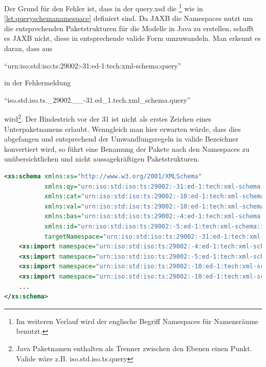Der Grund für den Fehler ist, dass in der query.xsd die \footnote{Im weiteren Verlauf wird der englische Begriff Namespaces für Namensräume benutzt.} wie in  \autoref{lst:queryschemanamespace} definiert sind. Da JAXB die \Glspl{Namespace} nutzt um die entsprechenden Paketstrukturen für die Modelle in Java zu erstellen, schafft es JAXB nicht, diese in entsprechende valide Form umzuwandeln. Man erkennt es daran, dass aus 

\enquote{urn:iso:std:iso:ts:29002:-31:ed-1:tech:xml-schema:query} 

in der Fehlermeldung 

\enquote{iso.std.iso.ts.\_29002.\_\_-31.ed\_1.tech.xml\_schema.query} 

wird\footnote{Java Paketnamen enthalten als Trenner zwischen den Ebenen einen Punkt. Valide wäre z.B. iso.std.iso.ts.query}.
Der Bindestrich vor der 31 ist nicht als erstes Zeichen eines Unterpaketnamens erlaubt. Wenngleich man hier erwarten würde, dass dies abgefangen und entsprechend der Umwandlungsregeln in valide Bezeichner konvertiert wird, so führt eine Benamung der Pakete nach den \Glspl{Namespace} zu unübersichtlichen und nicht aussagekräftigen Paketstrukturen. 

\begin{lstlisting}[caption=query.xsd Namespace Definitionen, language=XML, label=lst:queryschemanamespace]
<xs:schema xmlns:xs="http://www.w3.org/2001/XMLSchema"
           xmlns:qy="urn:iso:std:iso:ts:29002:-31:ed-1:tech:xml-schema:query"
           xmlns:cat="urn:iso:std:iso:ts:29002:-10:ed-1:tech:xml-schema:catalogue"
           xmlns:val="urn:iso:std:iso:ts:29002:-10:ed-1:tech:xml-schema:value"
           xmlns:bas="urn:iso:std:iso:ts:29002:-4:ed-1:tech:xml-schema:basic"
           xmlns:id="urn:iso:std:iso:ts:29002:-5:ed-1:tech:xml-schema:identifier"
           targetNamespace="urn:iso:std:iso:ts:29002:-31:ed-1:tech:xml-schema:query" elementFormDefault="qualified">
    <xs:import namespace="urn:iso:std:iso:ts:29002:-4:ed-1:tech:xml-schema:basic" schemaLocation="basic.xsd"/>
    <xs:import namespace="urn:iso:std:iso:ts:29002:-5:ed-1:tech:xml-schema:identifier" schemaLocation="identifier.xsd"/>
    <xs:import namespace="urn:iso:std:iso:ts:29002:-10:ed-1:tech:xml-schema:catalogue" schemaLocation="catalogue.xsd"/>
    <xs:import namespace="urn:iso:std:iso:ts:29002:-10:ed-1:tech:xml-schema:value" schemaLocation="value.xsd"/>
    ...
</xs:schema>    
\end{lstlisting}

